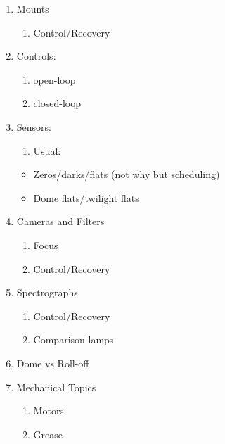 \documentclass[letter,11pt,oneside]{article}
\begin{document}
\begin{enumerate}
   \item   Mounts
\vspace{-.15cm}
\begin{enumerate}\addtolength{\itemsep}{-0.5\baselineskip}
   \item   Control/Recovery
\end{enumerate}

   \item   Controls:
\vspace{-.15cm}
\begin{enumerate}\addtolength{\itemsep}{-0.5\baselineskip}
   \item   open-loop
   \item   closed-loop
\end{enumerate}

   \item   Sensors:
\vspace{-.15cm}
\begin{enumerate}\addtolength{\itemsep}{-0.5\baselineskip}
   \item   Usual:
\end{enumerate}

\begin{itemize}
\addtolength{\itemsep}{-0.5\baselineskip}
   \item   Zeros/darks/flats (not why but scheduling)
   \item   Dome flats/twilight flats
\end{itemize}

   \item   Cameras and Filters
\vspace{-.15cm}
\begin{enumerate}\addtolength{\itemsep}{-0.5\baselineskip}
   \item   Focus
   \item   Control/Recovery
\end{enumerate}

   \item   Spectrographs
\vspace{-.15cm}
\begin{enumerate}\addtolength{\itemsep}{-0.5\baselineskip}
   \item   Control/Recovery
   \item   Comparison lamps
\end{enumerate}

   \item   Dome vs Roll-off
   \item   Mechanical Topics
\vspace{-.15cm}
\begin{enumerate}\addtolength{\itemsep}{-0.5\baselineskip}
   \item   Motors
   \item   Grease
\end{enumerate}


\end{enumerate}
\end{document}
